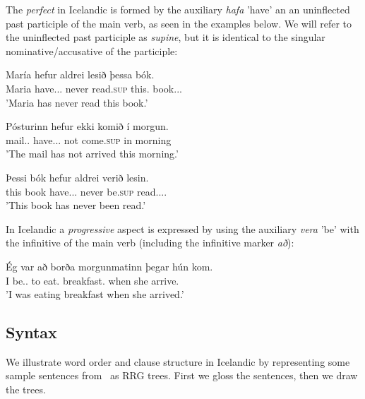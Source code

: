 \documentclass[12pt,%
    times,
]{lin-v2/lin}
\begin{document}
The \emph{perfect} in Icelandic is formed by the auxiliary \emph{hafa} 'have' an an uninflected past participle of the main verb,
as seen in the examples below. We will refer to the uninflected past participle as \emph{supine}, but it is identical to
the singular nominative/accusative of the participle:
\begin{exe}
    \ex
    \begin{xlist}
        \item \gll María hefur aldrei lesið þessa bók.\\
        Maria have.\Third\Sg.\Pst.\Aux{} never read.\textsc{sup} this.\Det{} book.\Nom.\Sg.\F{}\\
        \trans 'Maria has never read this book.'
        \item \gll Pósturinn hefur ekki komið í morgun.\\
        mail.\Sg.\Det{} have.\Third\Sg.\Pst.\Aux{} not come.\textsc{sup} in morning\\
        \trans 'The mail has not arrived this morning.'
        \item \gll Þessi bók hefur aldrei verið lesin.\\
        this book have.\Third\Sg.\Pst.\Aux{} never be.\textsc{sup} read.\Pst.\Ptcp.\Nom.\F{}\\
        \trans 'This book has never been read.'
    \end{xlist}
\end{exe}

In Icelandic a \emph{progressive} aspect is expressed by using the auxiliary \emph{vera} 'be' with the infinitive of the main verb
(including the infinitive marker \emph{að}):
\begin{exe}
    \ex
    \gll Ég var að borða morgunmatinn þegar hún kom.\\
    I be.\First\Sg.\Pst\Ind{} to eat.\Inf{} breakfast\Acc.\Det{} when she arrive.\Pst\\
    \trans 'I was eating breakfast when she arrived.'
\end{exe}


\subsection{Syntax}


We illustrate word order and clause structure in Icelandic by representing some sample
sentences from~\citep[17-18]{icelandic} as RRG trees. First we gloss the sentences, then we
draw the trees.
\end{document}
